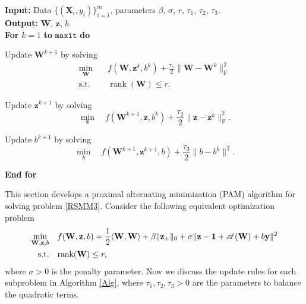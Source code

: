 \documentclass[sn-mathphys]{JORSC-jnl}%
\theoremstyle{thmstyleone}%
\theoremstyle{thmstylethree}%
\theoremstyle{thmstyleone} %
\begin{document}
\begin{algorithm}[t]
	\caption{Optimization algorithm for problem \eqref{P}} 
	\label{Alg} 
	\textbf{Input:}  Data $\{(\mathbf{X}_i, y_i)\}_{i=1}^m$, parameters $\beta$, $\sigma$, $r$, $\tau_1$, $\tau_2$, $\tau_3$.\\ 
	\textbf{Output:} $\mathbf{W}$, $\mathbf{z}$, $b$.\\
	\textbf{For} $k = 1$ \textbf{to} $\texttt{maxit}$ \textbf{do}
	\begin{algorithmic}[1]
		 \item  Update $\mathbf{W}^{k+1}$ by solving
		\begin{equation*}
			\begin{aligned}
				\underset{\mathbf{W}}{\min}\quad &f(\mathbf W,{\mathbf{z}}^{k},b^{k})+\frac{\tau_{1}}{2}\|\mathbf{W}-\mathbf{W}^{k}\|_{\textrm{F}}^{2}\\
				\text{s.t.}\quad &\operatorname{rank}(\mathbf{W}) \leq r.
			\end{aligned}
		\end{equation*}
		 \item  Update $\mathbf{z}^{k+1}$ by solving
		\begin{equation*}
			\underset{\mathbf{z}}{\min}\quad f(\mathbf{W}^{k+1},\mathbf{z},b^{k}) + \frac{\tau_{2}}{2}\|\mathbf{z}-\mathbf{z}^{k}\|_{\textrm{F}}^{2}.
		\end{equation*}
		 \item  Update $b^{k+1}$ by solving
		\begin{equation*}
			\underset{b}{\min}\quad f(\mathbf{W}^{k+1},\mathbf{z}^{k+1},b) + \frac{\tau_{3}}{2}\|b-b^{k}\|^2.
		\end{equation*}
	\end{algorithmic}
	\textbf{End for}
\end{algorithm}


This section develops a proximal alternating minimization (PAM) algorithm for solving problem \eqref{RSMM3}. 
Consider the following equivalent optimization problem
\begin{equation}\label{P}
\begin{aligned}
    \min\limits_{\mathbf W, \mathbf{z}, b}\quad
    & f(\mathbf{W},\mathbf{z},b)=\frac{1}{2}\langle\mathbf W,\mathbf W\rangle+\beta\|{\mathbf{z}}_+\|_0+\sigma\|{\mathbf{z}}-{\mathbf{1}}+\mathscr{A}(\mathbf{W})+b\mathbf{y}\|^{2}\\
 {\rm s.t.}\quad & \text{rank}(\mathbf{W}) \leq r,
	\end{aligned}
\end{equation}
where $\sigma>0$ is the penalty parameter. Now we discuss the update rules for each subproblem in Algorithm \ref{Alg}, where $\tau_1, \tau_2, \tau_3>0$ are the parameters to balance the quadratic terms.
\end{document}
